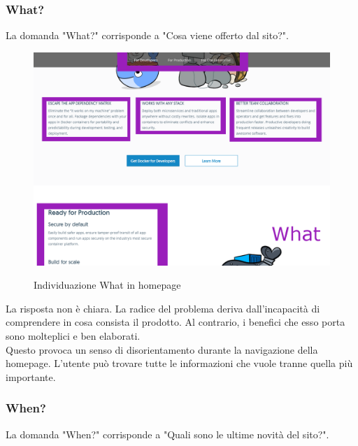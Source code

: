 \documentclass[a4paper]{article}
\begin{document}
\newpage
\subsubsection{What?}
La domanda "What?" corrisponde a "Cosa viene offerto dal sito?".

\begin{figure}[H]
	\centering
	\includegraphics[width=\linewidth]{images/what.png}
    \label{fig:homepagewhat}
    \caption{Individuazione What in homepage}
\end{figure}

\noindent La risposta non è chiara. La radice del problema deriva dall'incapacità di comprendere in cosa consista il prodotto. Al contrario, i benefici che esso porta sono molteplici e ben elaborati.
\\
Questo provoca un senso di disorientamento durante la navigazione della homepage. L'utente può trovare tutte le informazioni che vuole tranne quella più importante.

\newpage
\subsubsection{When?}
La domanda "When?" corrisponde a "Quali sono le ultime novità del sito?".
\end{document}
